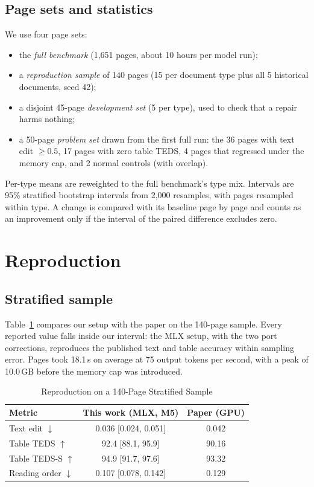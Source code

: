 \documentclass[journal]{IEEEtran}
\begin{document}
\subsection{Page sets and statistics}

We use four page sets:
\begin{itemize}
\item the \emph{full benchmark} (1,651 pages, about 10 hours per model run);
\item a \emph{reproduction sample} of 140 pages (15 per document type plus all 5
historical documents, seed 42);
\item a disjoint 45-page \emph{development set} (5 per type), used to check that
a repair harms nothing;
\item a 50-page \emph{problem set} drawn from the first full run: the 36 pages
with text edit $\geq 0.5$, 17 pages with zero table TEDS, 4 pages that regressed
under the memory cap, and 2 normal controls (with overlap).
\end{itemize}
Per-type means are reweighted to the full benchmark's type mix. Intervals are
95\% stratified bootstrap intervals \cite{efron1993bootstrap} from 2,000
resamples, with pages resampled within type. A change is compared with its
baseline page by page and counts as an improvement only if the interval of the
paired difference excludes zero.

\section{Reproduction}

\subsection{Stratified sample}

Table~\ref{tab:repro} compares our setup with the paper on the 140-page sample.
Every reported value falls inside our interval: the MLX setup, with the two port
corrections, reproduces the published text and table accuracy within sampling
error. Pages took 18.1\,s on average at 75 output tokens per second, with a
peak of 10.0\,GB before the memory cap was introduced.

\begin{table}[!t]
\caption{Reproduction on a 140-Page Stratified Sample}
\label{tab:repro}
\centering
\footnotesize
\begin{tabular}{@{}lcc@{}}
\toprule
Metric & This work (MLX, M5) & Paper (GPU) \\
\midrule
Text edit $\downarrow$ & 0.036 [0.024, 0.051] & 0.042 \\
Table TEDS $\uparrow$ & 92.4 [88.1, 95.9] & 90.16 \\
Table TEDS-S $\uparrow$ & 94.9 [91.7, 97.6] & 93.32 \\
Reading order $\downarrow$ & 0.107 [0.078, 0.142] & 0.129 \\
\bottomrule
\end{tabular}
\end{table}
\end{document}
